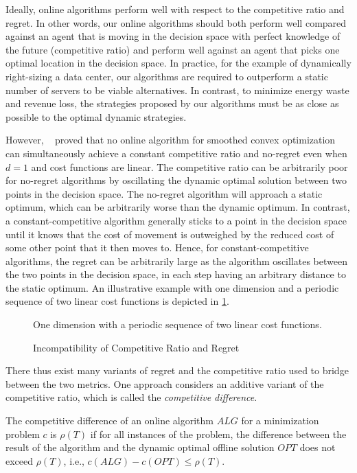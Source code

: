 Ideally, online algorithms perform well with respect to the competitive ratio and regret. In other words, our online algorithms should both perform well compared against an agent that is moving in the decision space with perfect knowledge of the future (competitive ratio) and perform well against an agent that picks one optimal location in the decision space. In practice, for the example of dynamically right-sizing a data center, our algorithms are required to outperform a static number of servers to be viable alternatives. In contrast, to minimize energy waste and revenue loss, the strategies proposed by our algorithms must be as close as possible to the optimal dynamic strategies.

However, \citeauthor*{Andrew2015}~\cite{Andrew2015} proved that no online algorithm for smoothed convex optimization can simultaneously achieve a constant competitive ratio and no-regret even when $d = 1$ and cost functions are linear. The competitive ratio can be arbitrarily poor for no-regret algorithms by oscillating the dynamic optimal solution between two points in the decision space. The no-regret algorithm will approach a static optimum, which can be arbitrarily worse than the dynamic optimum. In contrast, a constant-competitive algorithm generally sticks to a point in the decision space until it knows that the cost of movement is outweighed by the reduced cost of some other point that it then moves to. Hence, for constant-competitive algorithms, the regret can be arbitrarily large as the algorithm oscillates between the two points in the decision space, in each step having an arbitrary distance to the static optimum. An illustrative example with one dimension and a periodic sequence of two linear cost functions is depicted in \cref{fig:incompatibility_of_competitive_ratio_and_regret}.

\begin{figure}
    \centering
    [TODO]

    One dimension with a periodic sequence of two linear cost functions.
    \caption{Incompatibility of Competitive Ratio and Regret}
    \label{fig:incompatibility_of_competitive_ratio_and_regret}
\end{figure}

There thus exist many variants of regret and the competitive ratio used to bridge between the two metrics. One approach considers an additive variant of the competitive ratio, which is called the \emph{competitive difference}.

\begin{definition}
\cite{Chen2015} The competitive difference of an online algorithm $ALG$ for a minimization problem $c$ is $\rho(T)$ if for all instances of the problem, the difference between the result of the algorithm and the dynamic optimal offline solution $OPT$ does not exceed $\rho(T)$, i.e., $c(ALG) - c(OPT) \leq \rho(T)$.
\end{definition}

